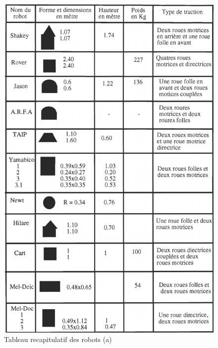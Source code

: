 \begin{figure}[h]
    \centering
    \includegraphics[width=14cm]{assets/Chapter2/chapitre2tab1.png}
    \caption{Tableau recapitulatif des robots (a)}
    \label{bottab1}

\end{figure}
\newpage
